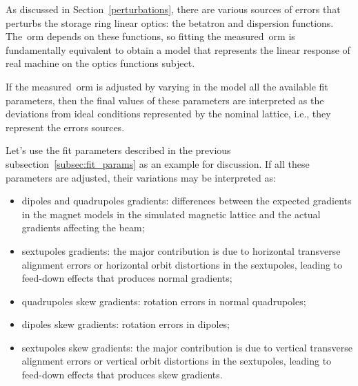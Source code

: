 As discussed in Section~\ref{perturbations}, there are various sources of errors that perturbs the storage ring linear optics: the betatron and dispersion functions. The~\gls{orm} depends on these functions, so fitting the measured~\gls{orm} is fundamentally equivalent to obtain a model that represents the linear response of real machine on the optics functions subject.

If the measured~\gls{orm} is adjusted by varying in the model all the available fit parameters, then the final values of these parameters are interpreted as the deviations from ideal conditions represented by the nominal lattice, i.e., they represent the errors sources. 

Let's use the fit parameters described in the previous subsection~\ref{subsec:fit_params} as an example for discussion. If all these parameters are adjusted, their variations may be interpreted as:
\begin{itemize}
    \item dipoles and quadrupoles gradients: differences between the expected gradients in the magnet models in the simulated magnetic lattice and the actual gradients affecting the beam;
    \item sextupoles gradients: the major contribution is due to horizontal transverse alignment errors or horizontal orbit distortions in the sextupoles, leading to feed-down effects that produces normal gradients;
    \item quadrupoles skew gradients: rotation errors in normal quadrupoles;
    \item dipoles skew gradients: rotation errors in dipoles;
    \item sextupoles skew gradients: the major contribution is due to vertical transverse alignment errors or vertical orbit distortions in the sextupoles, leading to feed-down effects that produces skew gradients. 
    \end{itemize}
